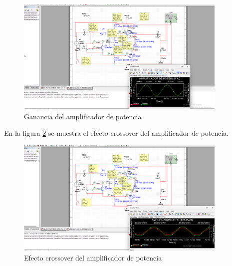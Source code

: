 \begin{figure}[ht]
    \centering
    \includegraphics[width=0.9\textwidth]{src/images/p1/p1-sim-ganancia.png}
    \caption{Ganancia del amplificador de potencia}
    \label{fig:sim-amp-potencia-ganancia}
\end{figure}

En la figura \ref{fig:sim-amp-potencia-efecto-crossover} se muestra el efecto crossover del amplificador de potencia. 

\begin{figure}[ht]
    \centering
    \includegraphics[width=0.9\textwidth]{src/images/p1/p1-sim-efecto-crossover.png}
    \caption{Efecto crossover del amplificador de potencia}
    \label{fig:sim-amp-potencia-efecto-crossover}
\end{figure}